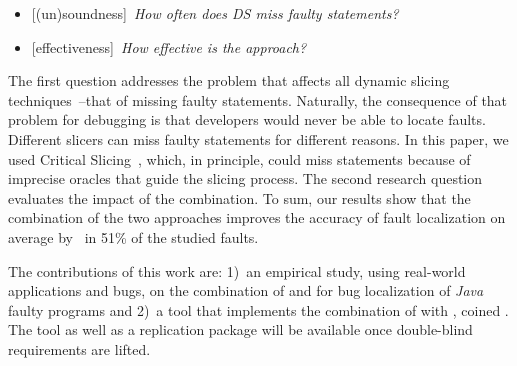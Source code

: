 \documentclass{article}
\begin{document}
\newcommand{\rqone}{How often does DS miss faulty statements?}
\newcommand{\rqthree}{How effective is the \comb{} approach?}

\begin{itemize}[leftmargin=*]
\item[]{\footnotesize[(un)soundness]}~\textit{\rqone{}}
\item[]{\footnotesize[effectiveness]}~\textit{\rqthree{}}
\end{itemize}

The first question addresses the problem that affects all dynamic
slicing techniques~\cite{Lin:2018:BDE:3238147.3238163}--that of
missing faulty statements. Naturally, the consequence of that problem
for debugging is that developers would never be able to locate
faults. Different slicers can miss faulty statements for different
reasons. In this paper, we used Critical
Slicing~\cite{DeMillo:1996:CSS:229000.226310}, which, in principle,
could miss statements because of imprecise oracles that guide the
slicing process. The second research question evaluates the
impact of the combination. To sum, our results show that the
combination of the two approaches improves the accuracy of fault
localization on average by \avgImprov\ in 51\% of the studied faults.

The contributions of this work are: 1)~an empirical study, using
real-world applications and bugs, on the combination of \ds{} and
\sfl{} for bug localization of \emph{Java} faulty programs and 2)~a
tool that implements the combination of \ds{} with \sfl{}, coined
\comb{}.  The tool as well as a replication package will be available
once double-blind requirements are lifted.





\end{document}
